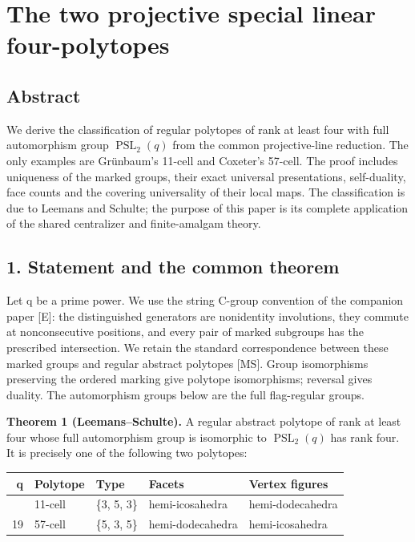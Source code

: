 \documentclass[
  11pt,
  a4paper,
]{article}
\author{}
\date{}
\newcounter{none} %
\begin{document}
\section{The two projective special linear
four-polytopes}\label{the-two-projective-special-linear-four-polytopes}

\subsection{Abstract}\label{abstract}

We derive the classification of regular polytopes of rank at least four
with full automorphism group \(\operatorname{PSL}_2(q)\) from the common
projective-line reduction. The only examples are Grünbaum's 11-cell and
Coxeter's 57-cell. The proof includes uniqueness of the marked groups,
their exact universal presentations, self-duality, face counts and the
covering universality of their local maps. The classification is due to
Leemans and Schulte; the purpose of this paper is its complete
application of the shared centralizer and finite-amalgam theory.

\subsection{1. Statement and the common
theorem}\label{statement-and-the-common-theorem}

Let q be a prime power. We use the string C-group convention of the
companion paper {[}E{]}: the distinguished generators are nonidentity
involutions, they commute at nonconsecutive positions, and every pair of
marked subgroups has the prescribed intersection. We retain the standard
correspondence between these marked groups and regular abstract
polytopes {[}MS{]}. Group isomorphisms preserving the ordered marking
give polytope isomorphisms; reversal gives duality. The automorphism
groups below are the full flag-regular groups.

\textbf{Theorem 1 (Leemans--Schulte).} A regular abstract polytope of
rank at least four whose full automorphism group is isomorphic to
\(\operatorname{PSL}_2(q)\) has rank four. It is precisely one of the
following two polytopes:

{\def\LTcaptype{none} %
\begin{longtable}[]{@{}rllll@{}}
\toprule\noalign{}
q & Polytope & Type & Facets & Vertex figures \\
\midrule\noalign{}
\endhead
\bottomrule\noalign{}
\endlastfoot
11 & 11-cell & \{3, 5, 3\} & hemi-icosahedra & hemi-dodecahedra \\
19 & 57-cell & \{5, 3, 5\} & hemi-dodecahedra & hemi-icosahedra \\
\end{longtable}
}
\end{document}
